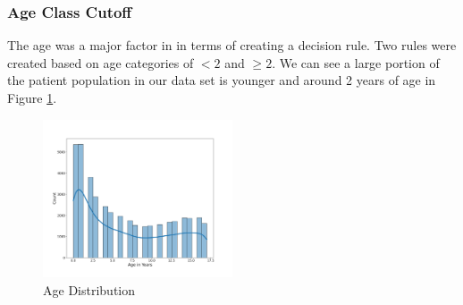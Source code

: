 \documentclass[11pt, letterpaper]{amsart}
\let\Oldsubsubsection\subsubsection
\renewcommand{\subsubsection}{\FloatBarrier\Oldsubsubsection}
\begin{document}
\subsubsection{Age Class Cutoff}

The age was a major factor in \cite{kuppermann2009identification} in terms of creating a decision rule. Two rules were created based on age categories of $< 2$ and $\geq 2$. We can see a large portion of the patient population in our data set is younger and around 2 years of age in Figure \ref{fig:age_dist}.
\begin{figure}
	\centering
	\includegraphics[width=0.5\textwidth]{age_dist.png}
	\caption{Age Distribution}\label{fig:age_dist}
\end{figure}
\end{document}

